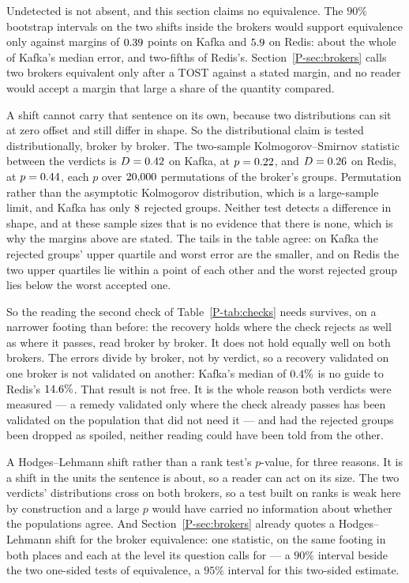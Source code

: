 \documentclass[10pt,journal,onecolumn]{IEEEtran}
\newcommand{\kafka}{Kafka}
\newcommand{\redis}{Redis}
\newcommand{\mainBrokers}{\ref{P-sec:brokers}}        %
\begin{document}
Undetected is not absent, and this section claims no equivalence. The $90\%$ bootstrap
intervals on the two shifts inside the brokers would support equivalence only against margins
of $0.39$ points on \kafka{} and $5.9$ on \redis{}:
about the whole of \kafka{}'s median error, and two-fifths of \redis{}'s.
Section~\mainBrokers{} calls two brokers equivalent only after a TOST against a stated margin,
and no reader would accept a margin that large a share of the quantity compared.

A shift cannot carry that sentence on its own, because two distributions can sit at zero offset
and still differ in shape. So the distributional claim is tested distributionally, broker by
broker. The two-sample Kolmogorov--Smirnov statistic between the verdicts is
$D = 0.42$ on \kafka{}, at $p = 0.22$, and $D = 0.26$ on
\redis{}, at $p = 0.44$, each $p$ over $20{,}000$ permutations of the
broker's groups. Permutation rather than the asymptotic Kolmogorov distribution, which is a
large-sample limit, and \kafka{} has only $8$ rejected groups. Neither test
detects a difference in shape, and at these sample sizes that is no evidence that there is none,
which is why the margins above are stated. The tails in the table agree: on \kafka{} the rejected
groups' upper quartile and worst error are the smaller, and on \redis{} the two upper quartiles
lie within a point of each other and the worst rejected group lies below the worst accepted one.

So the reading the second check of Table~\ref{P-tab:checks} needs survives, on a narrower footing
than before: the recovery holds where the check rejects as well as where it passes, read broker
by broker. It does not hold equally well on both brokers. The errors divide by broker, not by
verdict, so a recovery validated on one broker is not validated on another: \kafka{}'s median
of $0.4\%$ is no guide to \redis{}'s $14.6\%$. That
result is not free. It is the whole reason both verdicts were measured --- a remedy validated
only where the check already passes has been validated on the population that did not need it
--- and had the rejected groups been dropped as spoiled, neither reading could have been told
from the other.

A Hodges--Lehmann shift rather than a rank test's $p$-value, for three reasons. It is a shift in
the units the sentence is about, so a reader can act on its size. The two verdicts'
distributions cross on both brokers, so a test built on ranks is weak here by construction and
a large $p$ would have carried no information about whether the populations agree. And
Section~\mainBrokers{} already quotes a Hodges--Lehmann shift for the broker equivalence: one
statistic, on the same footing in both places and each at the level its question calls for ---
a $90\%$ interval beside the two one-sided tests of equivalence, a $95\%$ interval for this
two-sided estimate.
\end{document}
